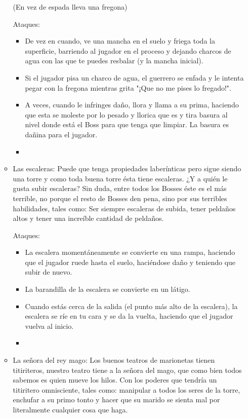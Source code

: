 \begin{itemize}
\begin{itemize}
        (En vez de espada lleva una fregona)
        
        Ataques:
        \begin{itemize}
            \item De vez en cuando, ve una mancha en el suelo y friega toda la superficie, barriendo al jugador en el proceso y dejando charcos de agua con las que te puedes resbalar (y la mancha inicial).
            \item Si el jugador pisa un charco de agua, el guerrero se enfada y le intenta pegar con la fregona mientras grita "¡Que no me pises lo fregado!".
            \item A veces, cuando le infringes daño, llora y llama a su prima, haciendo que esta se moleste por lo pesado y llorica que es y tira basura al nivel donde está el Boss para que tenga que limpiar. La basura es dañina para el jugador.
            \item 
        \end{itemize}
        \item Las escaleras: Puede que tenga propiedades laberínticas pero sigue siendo una torre y como toda buena torre ésta tiene escaleras. ¿Y a quién le gusta subir escaleras? Sin duda, entre todos los Bosses éste es el más terrible, no porque el resto de Bosses den pena, sino por sus terribles habilidades, tales como: Ser siempre escaleras de subida, tener peldaños altos y tener una increíble cantidad de peldaños.
        
        Ataques:
        \begin{itemize}
            \item La escalera momentáneamente se convierte en una rampa, haciendo que el jugador ruede hasta el suelo, haciéndose daño y teniendo que subir de nuevo.
            \item La barandilla de la escalera se convierte en un látigo.
            \item Cuando estás cerca de la salida (el punto más alto de la escalera), la escalera se ríe en tu cara y se da la vuelta, haciendo que el jugador vuelva al inicio.
            \item 
        \end{itemize}
        \item La señora del rey mago: Los buenos teatros de marionetas tienen titiriteros, nuestro teatro tiene a la señora del mago, que como bien todos sabemos es quien mueve los hilos. Con los poderes que tendría un titiritero omnisciente, tales como: manipular a todos los seres de la torre, enchufar a su primo tonto y hacer que su marido se sienta mal por literalmente cualquier cosa que haga.
        

\end{itemize}
\end{itemize}
